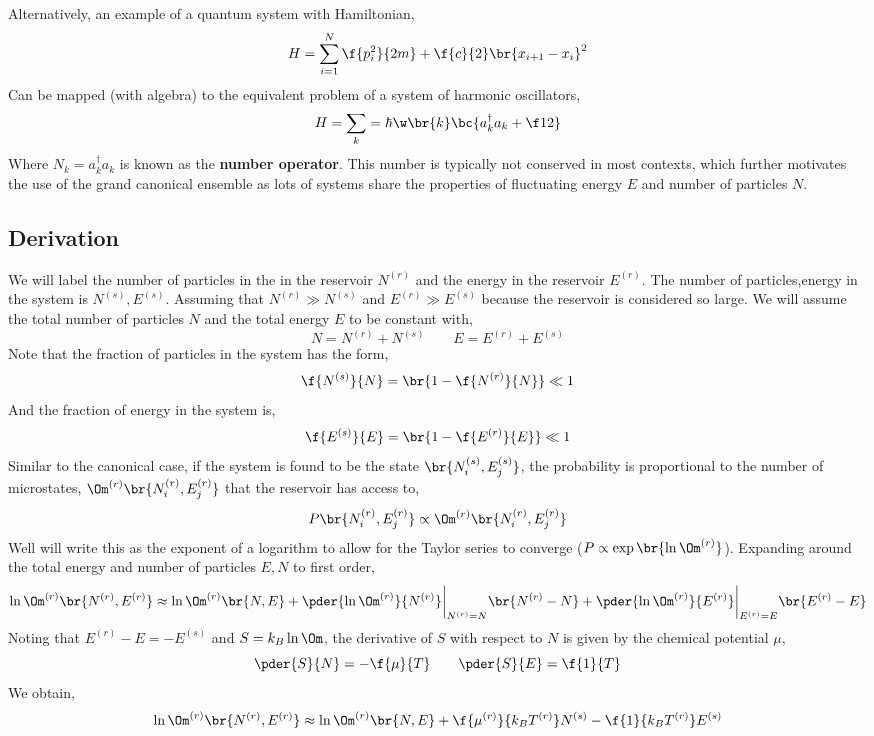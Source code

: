 \documentclass{article}
\begin{document}
{Alternatively, an example of a quantum system with Hamiltonian,
\[ H = \sum_{i = 1}^{N} \f{p_i^2}{2m} + \f{c}{2} \br{x_{i+1} - x_i}^2 \]
Can be mapped (with algebra) to the equivalent problem of a system of harmonic oscillators,
\[ H = \sum_k = \hbar \w\br{k} \bc{ a_k^\dagger a_k + \f12} \]
Where $N_k = a_k^\dagger a_k$ is known as the \textbf{number operator}. This number is typically not conserved in most contexts, which further motivates the use of the grand canonical ensemble as lots of systems share the properties of fluctuating energy $E$ and number of particles $N$.

\subsection{Derivation}

We will label the number of particles in the in the reservoir $N^{(r)}$ and the energy in the reservoir $E^{(r)}$. The number of particles,energy in the system is $N^{(s)}, E^{(s)}$. Assuming that $N^{(r)} \gg N^{(s)}$ and $E^{(r)} \gg E^{(s)}$ because the reservoir is considered so large. We will assume the total number of particles $N$ and the total energy $E$ to be constant with,
\[ N = N^{(r)} + N^{(s)} \qquad E = E^{(r)} + E^{(s)} \]
Note that the fraction of particles in the system has the form,
\[  \f{N^{(s)}}{N} = \br{1 - \f{N^{(r)}}{N}} \ll 1 \]
And the fraction of energy in the system is,
\[  \f{E^{(s)}}{E} = \br{1 - \f{E^{(r)}}{E}} \ll 1 \]
Similar to the canonical case, if the system is found to be the state $\br{N^{(s)}_i,E^{(s)}_j}$, the probability is proportional to the number of microstates, $\Om^{(r)}\br{N^{(r)}_i,E^{(r)}_j}$ that the reservoir has access to,
\[  P\br{N^{(r)}_i,E^{(r)}_j} \propto \Om^{(r)}\br{N^{(r)}_i,E^{(r)}_j} \]
Well will write this as the exponent of a logarithm to allow for the Taylor series to converge ($P \propto \exp \br{\ln \Om^{(r)}}$). Expanding around the total energy and number of particles $E,N$ to first order,
\[ \ln \Om^{(r)} \br{N^{(r)},E^{(r)}} \approx \ln \Om^{(r)} \br{N,E} + \pder{\ln \Om^{(r)}}{N^{(r)}} \bigg\rvert_{N^{(r)} = N} \br{N^{(r)} - N} + \pder{\ln \Om^{(r)}}{E^{(r)}} \bigg\rvert_{E^{(r)} = E} \br{E^{(r)} - E} \]
Noting that $E^{(r)} - E = - E^{(s)}$ and $S = k_B \ln \Om$, the derivative of $S$ with respect to $N$ is given by the chemical potential $\mu$,
\[ \pder{S}{N} = - \f{\mu}{T} \qquad \pder{S}{E} = \f{1}{T} \]
We obtain,
\[ \ln \Om^{(r)} \br{N^{(r)},E^{(r)}} \approx \ln \Om^{(r)} \br{N,E} + \f{\mu^{(r)}}{k_B T^{(r)}} N^{(s)} - \f{1}{k_B T^{(r)}} E^{(s)} \]
}
\end{document}
